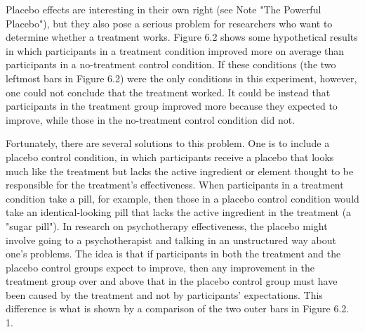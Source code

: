 Placebo effects are interesting in their own right (see Note "The Powerful Placebo"), but they also pose a serious problem for researchers who want to determine whether a treatment works. Figure 6.2 shows some hypothetical results in which participants in a treatment condition improved more on average than participants in a no-treatment control condition. If these conditions (the two leftmost bars in Figure 6.2) were the only conditions in this experiment, however, one could not conclude that the treatment worked. It could be instead that participants in the treatment group improved more because they expected to improve, while those in the no-treatment control condition did not.

Fortunately, there are several solutions to this problem. One is to include a placebo control condition, in which participants receive a placebo that looks much like the treatment but lacks the active ingredient or element thought to be responsible for the treatment's effectiveness. When participants in a treatment condition take a pill, for example, then those in a placebo control condition would take an identical-looking pill that lacks the active ingredient in the treatment (a "sugar pill"). In research on psychotherapy effectiveness, the placebo might involve going to a psychotherapist and talking in an unstructured way about one's problems. The idea is that if participants in both the treatment and the placebo control groups expect to improve, then any improvement in the treatment group over and above that in the placebo control group must have been caused by the treatment and not by participants' expectations. This difference is what is shown by a comparison of the two outer bars in Figure 6.2.
1.

